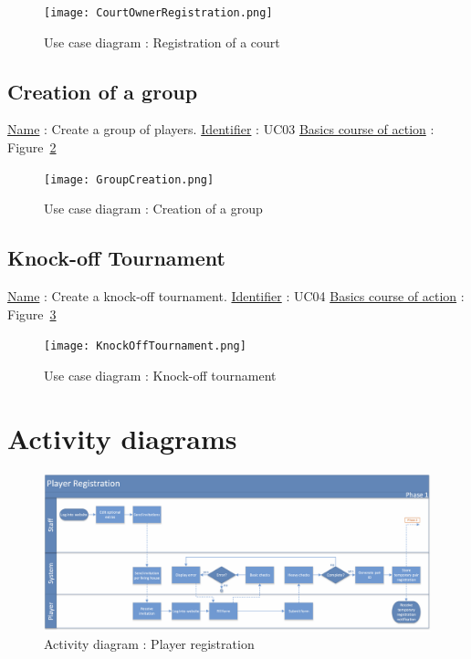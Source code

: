 \begin{figure}[!ht]
    \centering
    \texttt{[image: CourtOwnerRegistration.png]}
    \caption{Use case diagram : Registration of a court}
    \label{courtownerregfig}
\end{figure}
\FloatBarrier

\subsection{Creation of a group}

\noindent \underline{Name} : Create a group of players. \newline
\underline{Identifier} : UC03 \newline
\underline{Basics course of action} : Figure~\ref{groupcreationfig} \newline

\begin{figure}[!ht]
    \centering
    \texttt{[image: GroupCreation.png]}
    \caption{Use case diagram : Creation of a group}
    \label{groupcreationfig}
\end{figure}
\FloatBarrier

\subsection{Knock-off Tournament}

\noindent \underline{Name} : Create a knock-off tournament. \newline
\underline{Identifier} : UC04 \newline
\underline{Basics course of action} : Figure~\ref{knockofftournamentfig}\newline

\begin{figure}[!ht]
    \centering
    \texttt{[image: KnockOffTournament.png]}
    \caption{Use case diagram : Knock-off tournament}
    \label{knockofftournamentfig}
\end{figure}
\FloatBarrier

\section{Activity diagrams}

\newpage


\begin{figure}[!ht]
    \centering
    \includegraphics[width=0.9\linewidth]{res/Activity-diagram-PR-01-v2.png}
    \caption{Activity diagram : Player registration}
\end{figure}

